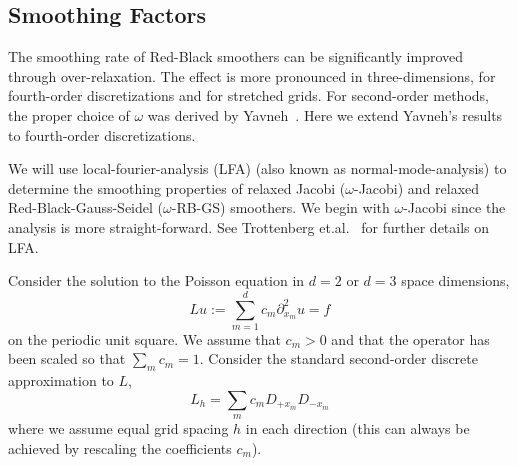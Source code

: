 \documentclass{article}
\begin{document}

\newcommand{\thetav}{\boldsymbol{\theta}}

\subsection{Smoothing Factors}

   The smoothing rate of Red-Black smoothers can be significantly improved through
over-relaxation. 
The effect is more pronounced in three-dimensions,
for fourth-order discretizations and for stretched grids.
For second-order methods, the proper choice of $\omega$ was derived by Yavneh~\cite{Yavneh96}. 
Here we extend Yavneh's results to fourth-order discretizations.



We will use local-fourier-analysis (LFA) (also known as normal-mode-analysis)
to determine the smoothing properties
of relaxed Jacobi ($\omega$-Jacobi) and relaxed Red-Black-Gauss-Seidel ($\omega$-RB-GS) smoothers.
We begin with $\omega$-Jacobi since the analysis is more straight-forward. See Trottenberg et.al.~\cite{Trottenberg2001}
for further details on LFA.

Consider the solution to the Poisson equation in $d=2$ or $d=3$ space dimensions,
\[
     L u := \sum_{m=1}^d c_m \partial_{x_m}^2 u  = f
\]
on the periodic unit square. 
We assume that $c_m>0$ and that the operator has been scaled so that
$\sum_m c_m =1$.
Consider the standard second-order discrete approximation to $L$, 
\[
   L_h = \sum_m c_m D_{+x_m}D_{-x_m} 
\]
where we assume equal grid spacing $h$ in each direction (this can always be achieved by rescaling
the coefficients $c_m$).
\end{document}
